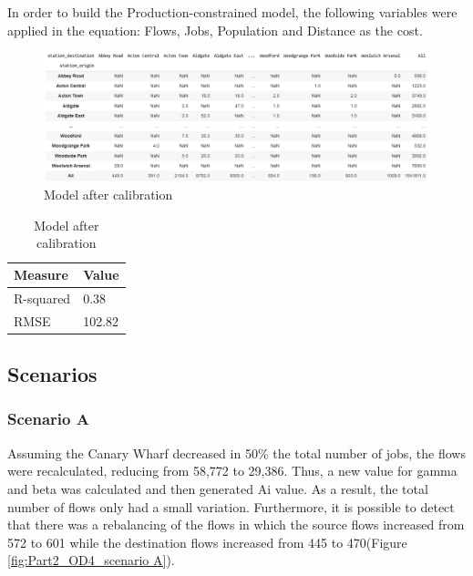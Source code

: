 \documentclass[10pt]{report}
\numberwithin{figure}{section}
\numberwithin{table}{section}
\begin{document}
In order to build the Production-constrained model, the following variables were applied in the equation: Flows, Jobs, Population and Distance as the cost. 

    \begin{figure}[htp]
        \centering
        \includegraphics[width=16cm]{Image/Part2_OD2.png}
        \caption{Model after calibration}
        \label{fig: Model after calibration}
    \end{figure}

\vspace{5mm} %

    \begin{table}[h]
    \centering
    \begin{tabular}{@{}ll@{}}
    \toprule
    \textbf{Measure} & \textbf{Value} \\ \midrule
    R-squared        & 0.38           \\
    RMSE             & 102.82     
    \end{tabular}
    \caption{Model after calibration}
    \label{table: calibration}
    \end{table}

\newpage    

\subsection{Scenarios}
\subsubsection{Scenario A}

Assuming the Canary Wharf decreased in 50\% the total number of jobs, the flows were recalculated, reducing from 58,772 to 29,386. Thus, a new value for gamma and beta was calculated and then generated Ai value. As a result, the total number of flows only had a small variation. Furthermore, it is possible to detect that there was a rebalancing of the flows in which the source flows increased from 572 to 601 while the destination flows increased from 445 to 470(Figure \ref{fig:Part2_OD4_scenario A}).
\end{document}
